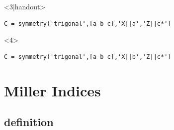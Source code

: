\documentclass[compress]{beamer}
\begin{document}
\begin{frame}[fragile]
\begin{overlayarea}{\textwidth}{8cm}
\begin{columns}
\begin{column}{4.5cm}
\begin{tikzpicture}[x  = {(-0.5cm,-0.5cm)},
        y  = {(0.9659cm,-0.25882cm)},
        z  = {(0cm,1cm)},
        scale = 2]
\end{tikzpicture}

\end{column}
\end{columns}

\begin{onlyenv}<3|handout>
  \begin{lstlisting}[style=input]
C = symmetry('trigonal',[a b c],'X||a','Z||c*')
  \end{lstlisting}
\end{onlyenv}

\begin{onlyenv}<4>
  \begin{lstlisting}[style=input]
C = symmetry('trigonal',[a b c],'X||b','Z||c*')
  \end{lstlisting}
\end{onlyenv}
\end{overlayarea}
\end{frame}

\section{Miller Indices}
\label{sec:miller-indices}

\subsection*{definition}
\label{sec:definition}
\end{document}
